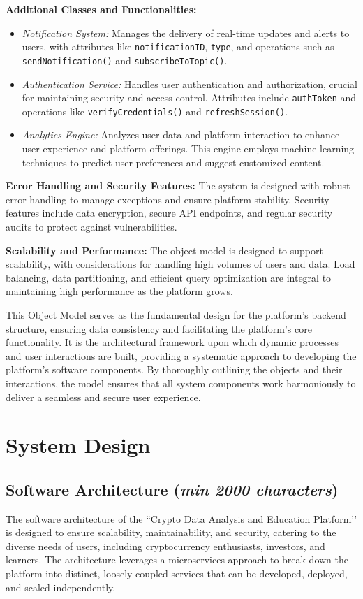 \documentclass[12pt]{report}
\newcommand{\characters}[1]{(\textit{min #1 characters})}
\begin{document}
\textbf{Additional Classes and Functionalities:}
\begin{itemize}
    \item \textit{Notification System:} Manages the delivery of real-time updates and alerts to users, with attributes like \texttt{notificationID}, \texttt{type}, and operations such as \texttt{sendNotification()} and \texttt{subscribeToTopic()}.
    \item \textit{Authentication Service:} Handles user authentication and authorization, crucial for maintaining security and access control. Attributes include \texttt{authToken} and operations like \texttt{verifyCredentials()} and \texttt{refreshSession()}.
    \item \textit{Analytics Engine:} Analyzes user data and platform interaction to enhance user experience and platform offerings. This engine employs machine learning techniques to predict user preferences and suggest customized content.
\end{itemize}

\textbf{Error Handling and Security Features:}
The system is designed with robust error handling to manage exceptions and ensure platform stability. Security features include data encryption, secure API endpoints, and regular security audits to protect against vulnerabilities.

\textbf{Scalability and Performance:}
The object model is designed to support scalability, with considerations for handling high volumes of users and data. Load balancing, data partitioning, and efficient query optimization are integral to maintaining high performance as the platform grows.

This Object Model serves as the fundamental design for the platform's backend structure, ensuring data consistency and facilitating the platform's core functionality. It is the architectural framework upon which dynamic processes and user interactions are built, providing a systematic approach to developing the platform's software components. By thoroughly outlining the objects and their interactions, the model ensures that all system components work harmoniously to deliver a seamless and secure user experience.

\section{System Design}
\subsection{Software Architecture \characters{2000}}
The software architecture of the ``Crypto Data Analysis and Education Platform’’ is designed to ensure scalability, maintainability, and security, catering to the diverse needs of users, including cryptocurrency enthusiasts, investors, and learners. The architecture leverages a microservices approach to break down the platform into distinct, loosely coupled services that can be developed, deployed, and scaled independently.
\end{document}
